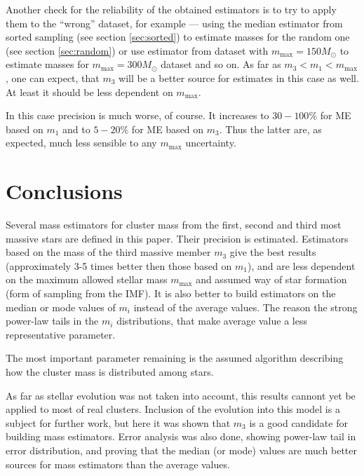 \documentclass{aastex}
\newcommand{\MSun}{M_\odot}
\newcommand{\Mmax}{m_{\mathrm{max}}}
\begin{document}
Another check for the reliability of the obtained estimators is to try to apply them to the ``wrong'' dataset, for example --- using the median estimator from sorted sampling (see section \ref{sec:sorted}) to estimate masses for the random one (see section \ref{sec:random}) or use estimator from dataset with $\Mmax = 150 \MSun$ to estimate masses for $\Mmax = 300 \MSun$ dataset and so on. As far as $m_3 < m_1 < \Mmax$, one can expect, that $m_3$ will be a better source for estimates in this case as well. At least 
it should be less dependent on $\Mmax$.

In this case precision is much worse, of course. It increases to $30-100\%$ for ME based on $m_1$ and to $5-20 \%$ for ME based on $m_3$. 
Thus the latter are, as expected, much less sensible to any $\Mmax$ uncertainty.


\section{Conclusions}

Several mass estimators for cluster mass from the first, second and third most massive stars are defined in this paper. Their precision is estimated. Estimators based on the mass of the third massive member $m_3$ 
give the best results (approximately 3-5 times better then those based on $m_1$), and are less dependent on the maximum allowed stellar mass $\Mmax$ and assumed way of star formation (form of sampling from the IMF). 
It is also better to build estimators on the median or mode values of $m_i$ instead of the average values. The reason the strong power-law tails in the  $m_i$ distributions, that make average value a less representative parameter.

The most important parameter remaining is the assumed algorithm describing how the cluster mass is distributed among stars.

As far as stellar evolution was not taken into account, this results cannont yet be applied to most of real clusters. Inclusion
of the evolution into this model is a subject for further work, but here it was shown that $m_3$ is a good candidate for building 
mass estimators. Error analysis was also done, showing power-law tail in error distribution, and proving that the median (or mode) values 
are much better sources for mass estimators than the average values.
\end{document}
